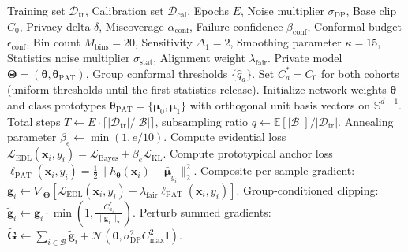 \documentclass[pdflatex,sn-vancouver-num,referee,lineno]{sn-jnl}
\theoremstyle{thmstyleone}
\theoremstyle{thmstylethree}
\begin{document}
\begin{algorithm}[t]
\caption{TRACER-Med Unified Training and Conformal Calibration Pipeline}
\label{alg:tracer}
\begin{algorithmic}[1]
\REQUIRE Training set $\mathcal{D}_{\text{tr}}$, Calibration set $\mathcal{D}_{\text{cal}}$, Epochs $E$, Noise multiplier $\sigma_{\text{DP}}$, Base clip $C_0$, Privacy delta $\delta$, Miscoverage $\alpha_{\text{conf}}$, Failure confidence $\beta_{\text{conf}}$, Conformal budget $\epsilon_{\text{conf}}$, Bin count $M_{\text{bins}} = 20$, Sensitivity $\Delta_1 = 2$, Smoothing parameter $\kappa = 15$, Statistics noise multiplier $\sigma_{\text{stat}}$, Alignment weight $\lambda_{\text{fair}}$.
\ENSURE Private model $\boldsymbol{\Theta} = (\boldsymbol{\theta}, \boldsymbol{\theta}_{\text{PAT}})$, Group conformal thresholds $\{\hat{q}_a\}$.
\STATE Set $C_a^* = C_0$ for both cohorts (uniform thresholds until the first statistics release).
\STATE Initialize network weights $\boldsymbol{\theta}$ and class prototypes $\boldsymbol{\theta}_{\text{PAT}} = \{\bar{\boldsymbol{\mu}}_0, \bar{\boldsymbol{\mu}}_1\}$ with orthogonal unit basis vectors on $\mathbb{S}^{d-1}$.
\STATE Total steps $T \leftarrow E \cdot \lceil |\mathcal{D}_{\text{tr}}| / |\mathcal{B}| \rceil$, subsampling ratio $q \leftarrow \mathbb{E}[|\mathcal{B}|] / |\mathcal{D}_{\text{tr}}|$.
    \STATE Annealing parameter $\beta_e \leftarrow \min(1, e/10)$.
            \STATE Compute evidential loss $\mathcal{L}_{\text{EDL}}(\mathbf{x}_i, y_i) = \mathcal{L}_{\text{Bayes}} + \beta_e \mathcal{L}_{\text{KL}}$.
            \STATE Compute prototypical anchor loss $\ell_{\text{PAT}}(\mathbf{x}_i, y_i) = \frac{1}{2} \|h_{\boldsymbol{\theta}}(\mathbf{x}_i) - \bar{\boldsymbol{\mu}}_{y_i}\|_2^2$.
            \STATE Composite per-sample gradient: $\mathbf{g}_i \leftarrow \nabla_{\boldsymbol{\Theta}} \left[\mathcal{L}_{\text{EDL}}(\mathbf{x}_i, y_i) + \lambda_{\text{fair}} \ell_{\text{PAT}}(\mathbf{x}_i, y_i)\right]$.
            \STATE Group-conditioned clipping: $\tilde{\mathbf{g}}_i \leftarrow \mathbf{g}_i \cdot \min\left(1, \frac{C_{a_i}^*}{\|\mathbf{g}_i\|_2}\right)$.
        \ENDFOR
        \STATE Perturb summed gradients: $\tilde{\mathbf{G}} \leftarrow \sum_{i \in \mathcal{B}} \tilde{\mathbf{g}}_i + \mathcal{N}\left(\mathbf{0}, \sigma_{\text{DP}}^2 C_{\max}^2 \mathbf{I}\right)$.

\end{algorithmic}
\end{algorithm}
\end{document}
